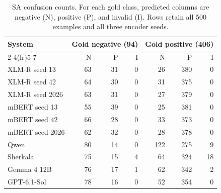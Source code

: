 \begin{table}[t]
\centering\footnotesize
\caption{SA confusion counts. For each gold class, predicted columns are negative (N), positive (P), and invalid (I). Rows retain all 500 examples and all three encoder seeds.}
\label{tab:sa-confusions}
\begin{tabular}{lrrrrrr}
\toprule
System & \multicolumn{3}{c}{Gold negative (94)} & \multicolumn{3}{c}{Gold positive (406)}\\\cmidrule(lr){2-4}\cmidrule(lr){5-7} & N & P & I & N & P & I\\
\midrule
XLM-R seed 13 & 63 & 31 & 0 & 26 & 380 & 0\\
XLM-R seed 42 & 64 & 30 & 0 & 31 & 375 & 0\\
XLM-R seed 2026 & 63 & 31 & 0 & 27 & 379 & 0\\
mBERT seed 13 & 55 & 39 & 0 & 25 & 381 & 0\\
mBERT seed 42 & 66 & 28 & 0 & 33 & 373 & 0\\
mBERT seed 2026 & 62 & 32 & 0 & 28 & 378 & 0\\
Qwen & 80 & 14 & 0 & 122 & 275 & 9\\
Sherkala & 75 & 15 & 4 & 64 & 324 & 18\\
Gemma 4 12B & 76 & 17 & 1 & 62 & 342 & 2\\
GPT-6.1-Sol & 78 & 16 & 0 & 52 & 354 & 0\\
\bottomrule
\end{tabular}
\end{table}
